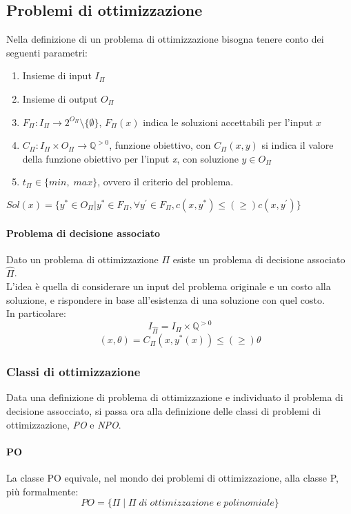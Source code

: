 \subsection{Problemi di ottimizzazione}
Nella definizione di un problema di ottimizzazione bisogna tenere conto dei 
seguenti parametri:
\begin{enumerate}
    \item Insieme di input $I_\Pi$
    \item Insieme di output $O_\Pi$
    \item $F_\Pi : I_\Pi \rightarrow 2^{O_\Pi} \setminus \{\emptyset\}$, $F_\Pi(x)$ indica 
    le soluzioni accettabili per l'input $x$
    \item $C_\Pi : I_\Pi \times O_\Pi \rightarrow \mathbb{Q}^{>0}$, funzione obiettivo, 
    con $C_\Pi(x,y)$ si indica il valore della funzione obiettivo per l'input \emph{x}, con soluzione $y \in O_\Pi$
    \item $t_\Pi \in \{min, \;max\}$, ovvero il criterio del problema.
\end{enumerate}
\begin{remark}
    $Sol(x) = \{y^* \in O_\Pi | y^* \in F_\Pi, \forall y^\prime \in F_\Pi, c(x, y^*) \leqslant (\geq ) c(x, y^\prime)\}$
\end{remark}
\paragraph{Problema di decisione associato}
Dato un problema di ottimizzazione $\Pi$ esiste un problema di decisione associato $\hat{\Pi}$.
\\L'idea è quella di considerare un input del problema originale e un costo alla soluzione, e rispondere
in base all'esistenza di una soluzione con quel costo.\\
In particolare: $$I_{\hat{\Pi}} = I_\Pi \times \mathbb{Q}^{>0}$$ 
$$(x, \theta) = C_\Pi(x, y^*(x)) \leqslant (\geq ) \theta$$

\subsubsection{Classi di ottimizzazione}
Data una definizione di problema di ottimizzazione e individuato il problema di decisione 
assocciato, si passa ora alla definizione delle classi di problemi di ottimizzazione, \emph{PO}
e \emph{NPO}.

\paragraph{PO}
La classe PO equivale, nel mondo dei problemi di ottimizzazione, alla classe P,
più formalmente:
$$PO = \{ \Pi\;|\;\Pi\;di\;ottimizzazione\;e\;polinomiale\}$$

